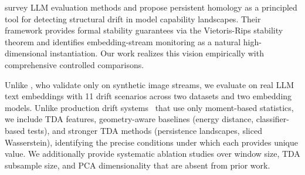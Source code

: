 \citet{yang2026matheval} survey LLM evaluation methods and propose persistent homology as a principled tool for detecting structural drift in model capability landscapes. Their framework provides formal stability guarantees via the Vietoris-Rips stability theorem and identifies embedding-stream monitoring as a natural high-dimensional instantiation. Our work realizes this vision empirically with comprehensive controlled comparisons.

Unlike \citet{basterrech2024unsupervised}, who validate only on synthetic image streams, we evaluate on real LLM text embeddings with 11 drift scenarios across two datasets and two embedding models. Unlike production drift systems~\cite{khaki2023uncovering, greco2024driftlens} that use only moment-based statistics, we include TDA features, geometry-aware baselines (energy distance, classifier-based tests), and stronger TDA methods (persistence landscapes, sliced Wasserstein), identifying the precise conditions under which each provides unique value. We additionally provide systematic ablation studies over window size, TDA subsample size, and PCA dimensionality that are absent from prior work.
